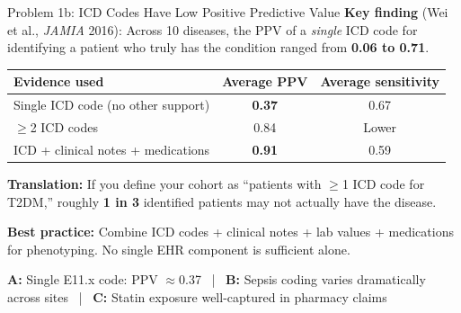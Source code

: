 \documentclass[aspectratio=169,10pt]{beamer}
\begin{document}
\begin{frame}{Problem 1b: ICD Codes Have Low Positive Predictive Value}
\textbf{Key finding} (Wei et al., \textit{JAMIA} 2016): Across 10 diseases, the PPV of a \emph{single} ICD code for identifying a patient who truly has the condition ranged from \textbf{0.06 to 0.71}.

\vspace{0.5em}
\begin{center}
\small
\begin{tabular}{lcc}
\toprule
\textbf{Evidence used} & \textbf{Average PPV} & \textbf{Average sensitivity} \\
\midrule
Single ICD code (no other support) & \textbf{0.37} & 0.67 \\
$\geq$2 ICD codes & 0.84 & Lower \\
ICD + clinical notes + medications & \textbf{0.91} & 0.59 \\
\bottomrule
\end{tabular}
\end{center}

\vspace{0.5em}
\textbf{Translation:} If you define your cohort as ``patients with $\geq$1 ICD code for T2DM,'' roughly \textbf{1 in 3} identified patients may not actually have the disease.

\vspace{0.3em}
\textbf{Best practice:} Combine ICD codes + clinical notes + lab values + medications for phenotyping. No single EHR component is sufficient alone.

\begin{center}\tiny
\textbf{\color{columbia}A:} Single E11.x code: PPV $\approx$0.37 ~|~ \textbf{\color{columbiaaccent}B:} Sepsis coding varies dramatically across sites ~|~ \textbf{\color{columbiagray}C:} Statin exposure well-captured in pharmacy claims
\end{center}
\end{frame}
\end{document}
